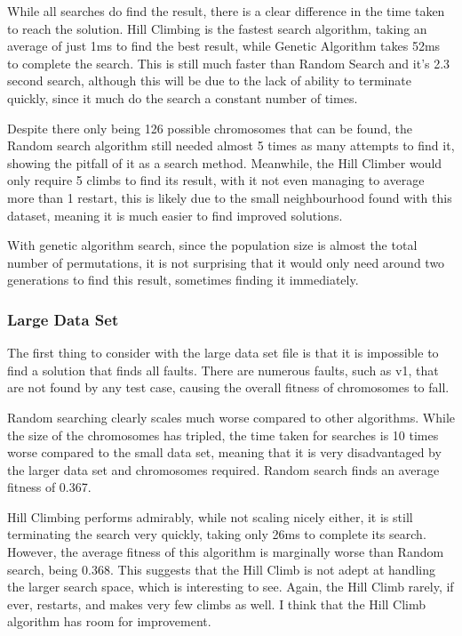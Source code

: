 \documentclass[11pt, a4paper]{article}
\begin{document}
While all searches do find the result, there is a clear difference in the time
taken to reach the solution. Hill Climbing is the fastest search algorithm,
taking an average of just 1ms to find the best result, while Genetic Algorithm
takes 52ms to complete the search. This is still much faster than Random Search
and it's 2.3 second search, although this will be due to the lack of ability to
terminate quickly, since it much do the search a constant number of times.

Despite there only being 126 possible chromosomes that can be found, the
Random search algorithm still needed almost 5 times as many attempts to find it,
showing the pitfall of it as a search method. Meanwhile, the Hill Climber would
only require 5 climbs to find its result, with it not even managing to average
more than 1 restart, this is likely due to the small neighbourhood found with
this dataset, meaning it is much easier to find improved solutions.

With genetic algorithm search, since the population size is almost the total
number of permutations, it is not surprising that it would only need around two
generations to find this result, sometimes finding it immediately.

\subsubsection{Large Data Set} %
\label{ssub:large_data_set}
The first thing to consider with the large data set file is that it is
impossible to find a solution that finds all faults. There are numerous faults,
such as v1, that are not found by any test case, causing the overall fitness of
chromosomes to fall.

Random searching clearly scales much worse compared to other algorithms. While
the size of the chromosomes has tripled, the time taken for searches is 10 times
worse compared to the small data set, meaning that it is very disadvantaged by
the larger data set and chromosomes required. Random search finds an average
fitness of 0.367.

Hill Climbing performs admirably, while not scaling nicely either, it is still
terminating the search very quickly, taking only 26ms to complete its search.
However, the average fitness of this algorithm is marginally worse than Random
search, being 0.368. This suggests that the Hill Climb is not adept at handling
the larger search space, which is interesting to see. Again, the Hill Climb
rarely, if ever, restarts, and makes very few climbs as well. I think that the
Hill Climb algorithm has room for improvement.
\end{document}

